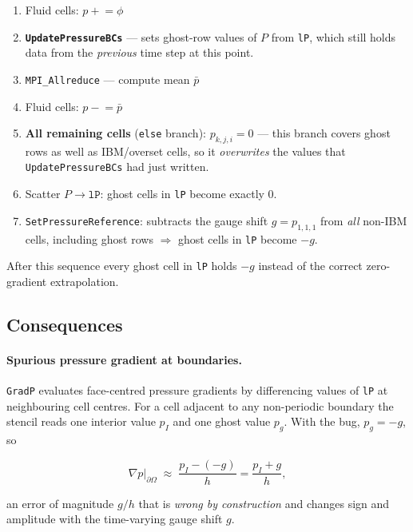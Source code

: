 \documentclass[12pt,a4paper]{article}
\begin{document}
\begin{enumerate}
  \item Fluid cells: $p \mathrel{+}= \phi$
  \item \textbf{\texttt{UpdatePressureBCs}} — sets ghost-row values of
        $P$ from \texttt{lP}, which still holds data from the
        \emph{previous} time step at this point.
  \item \texttt{MPI\_Allreduce} — compute mean $\bar{p}$
  \item Fluid cells: $p \mathrel{-}= \bar{p}$
  \item \textbf{All remaining cells} (\texttt{else} branch):
        $p_{k,j,i} = 0$ — this branch covers ghost rows as well as
        IBM/overset cells, so it \emph{overwrites} the values that
        \texttt{UpdatePressureBCs} had just written.
  \item Scatter $P \to \mathtt{lP}$: ghost cells in \texttt{lP} become
        exactly $0$.
  \item \texttt{SetPressureReference}: subtracts the gauge shift
        $g = p_{1,1,1}$ from \emph{all} non-IBM cells, including ghost
        rows $\Rightarrow$ ghost cells in \texttt{lP} become $-g$.
\end{enumerate}

After this sequence every ghost cell in \texttt{lP} holds $-g$ instead
of the correct zero-gradient extrapolation.

\subsection{Consequences}
\label{sec:peqn-bc-bug-consequences}

\paragraph{Spurious pressure gradient at boundaries.}
\texttt{GradP} evaluates face-centred pressure gradients by differencing
values of \texttt{lP} at neighbouring cell centres.  For a cell adjacent
to any non-periodic boundary the stencil reads one interior value $p_I$
and one ghost value $p_g$.  With the bug, $p_g = -g$, so

\begin{equation}
  \nabla p\big|_{\partial\Omega} \;\approx\; \frac{p_I - (-g)}{h}
  = \frac{p_I + g}{h},
\end{equation}

an error of magnitude $g/h$ that is \emph{wrong by construction}
and changes sign and amplitude with the time-varying gauge shift $g$.
\end{document}
